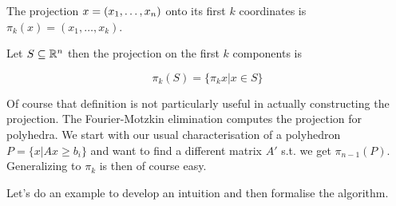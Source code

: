 \begin{Def} The projection $x=({x}_1,\ldots,{x}_{n})$ onto its first $k$ coordinates is $\pi_k(x) = (x_1,\ldots, x_k)$. 

Let $S\subseteq \mathbb{R}^n$ then the projection on the first $k$ components is

\[\pi_k(S)=\{\pi_k{x}|x\in S\}\]
\end{Def}

Of course that definition is not particularly useful in actually constructing the projection. The Fourier-Motzkin elimination computes the projection for polyhedra. We start with our usual characterisation of a polyhedron $P=\{x|Ax\geq b_i\}$ and want to find a different matrix $A'$ s.t. we get $\pi_{n-1}(P)$. Generalizing to $\pi_k$ is then of course easy.

Let's do an example to develop an intuition and then formalise the algorithm.

